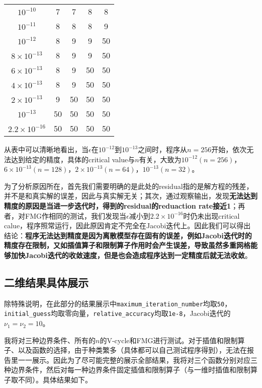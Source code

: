 \documentclass{ctexart}
\begin{document}
\begin{sloppypar}
\begin{table}[H]
\begin{center}
\begin{tabular}{ccccc}
  $10^{-10}$ &7 &7 &8 &8 \\

  $10^{-11}$ &8 &8 &8 &9  \\

  $10^{-12}$ &8 &9 &9 &50  \\

  $8 \times 10^{-13}$ &8 &9 &9 &50  \\

  $6 \times 10^{-13}$ &8 &9 &50 &50  \\

  $4 \times 10^{-13}$ &8 &9 &50 &50  \\
  
  $2 \times 10^{-13}$ &9 &50 &50 &50  \\

  $10^{-13}$ &50 &50 &50 &50  \\
 
  $2.2 \times 10^{-16}$ &50 &50 &50 &50 \\
  \hline
\end{tabular}
\end{center}
\end{table}

从表中可以清晰地看出，当$\epsilon$在$10^{-12}$到$10^{-13}$之间时，程序从$n=256$开始，依次无法达到给定的精度，具体的critical value与$n$有关，大致为$10^{-12}(n=256)$，$6\times10^{-13}(n=128)$，$2\times10^{-13}(n=64)$，$10^{-13}(n=32)$。

为了分析原因所在，首先我们需要明确的是此处的residual指的是解方程的残差，并不是和真实解的误差，因此与真实解无关；其次，通过观察输出，发现\textbf{无法达到精度的原因是当进一步迭代时，得到的residual的reduaction rate接近1}；再者，对FMG作相同的测试，我们发现当$\epsilon$减小到$2.2 \times 10^{-16}$时仍未出现critical calue，程序照常运行，因此原因肯定不完全在Jacobi迭代上。因此我们可以得出结论：\textbf{程序无法达到精度是因为离散模型存在固有的误差，例如Jacobi迭代时的精度存在限制，又如插值算子和限制算子作用时会产生误差，导致虽然多重网格能够加快Jacobi迭代的收敛速度，但是也会造成程序达到一定精度后就无法收敛}。

\subsection{二维结果具体展示}

除特殊说明，在此部分的结果展示中\verb|maximum_iteration_number|均取\verb|50|，\verb|initial_guess|均取零向量，\verb|relative_accuracy|均取\verb|1e-8|，Jacobi迭代的$\nu_1=\nu_2=10$。

我将对三种边界条件、所有的$n$的V-cycle和FMG进行测试。对于插值和限制算子、以及函数的选择，由于种类繁多（具体都可以自己测试程序得到），无法在报告里一一展示。因此为了尽可能完整的展示全部结果，我将对三个函数分别对应三种边界条件，然后对每一种边界条件固定插值和限制算子（与一维时插值和限制算子取不同）。具体结果如下。


\end{sloppypar}
\end{document}
